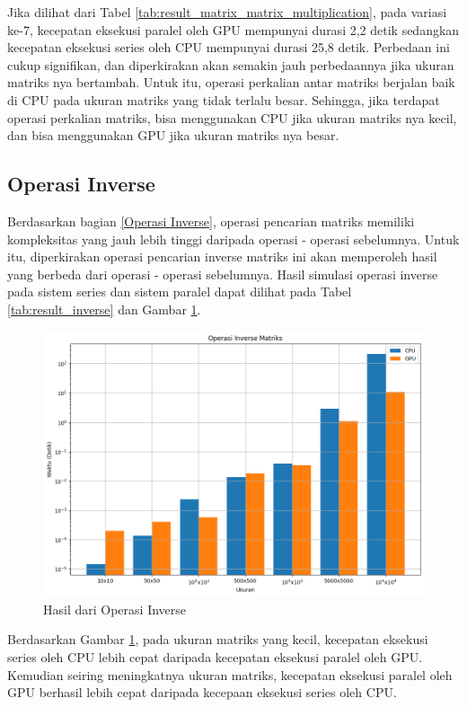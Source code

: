 Jika dilihat dari Tabel \ref{tab:result_matrix_matrix_multiplication}, pada variasi ke-7, kecepatan eksekusi paralel oleh GPU mempunyai durasi 2,2 detik sedangkan kecepatan eksekusi series oleh CPU mempunyai durasi 25,8 detik. Perbedaan ini cukup signifikan, dan diperkirakan akan semakin jauh perbedaannya jika ukuran matriks nya bertambah. Untuk itu, operasi perkalian antar matriks berjalan baik di CPU pada ukuran matriks yang tidak terlalu besar. Sehingga, jika terdapat operasi perkalian matriks, bisa menggunakan CPU jika ukuran matriks nya kecil, dan bisa menggunakan GPU jika ukuran matriks nya besar.

\subsection{Operasi Inverse}

Berdasarkan bagian \ref{Operasi Inverse}, operasi pencarian matriks memiliki kompleksitas yang jauh lebih tinggi daripada operasi - operasi sebelumnya. Untuk itu, diperkirakan operasi pencarian inverse matriks ini akan memperoleh hasil yang berbeda dari operasi - operasi sebelumnya. Hasil simulasi operasi inverse pada sistem series dan sistem paralel dapat dilihat pada Tabel \ref{tab:result_inverse} dan Gambar \ref{img:result_inverse}.

\begin{figure}[H]
	\centering
	\includegraphics[width=14cm, scale=1]{images/penelitian/inverse.png}
	\caption{Hasil dari Operasi Inverse}
	\label{img:result_inverse}
\end{figure}

Berdasarkan Gambar \ref{img:result_inverse}, pada ukuran matriks yang kecil, kecepatan eksekusi series oleh CPU lebih cepat daripada kecepatan eksekusi paralel oleh GPU. Kemudian seiring meningkatnya ukuran matriks, kecepatan eksekusi paralel oleh GPU berhasil lebih cepat daripada kecepaan eksekusi series oleh CPU.

